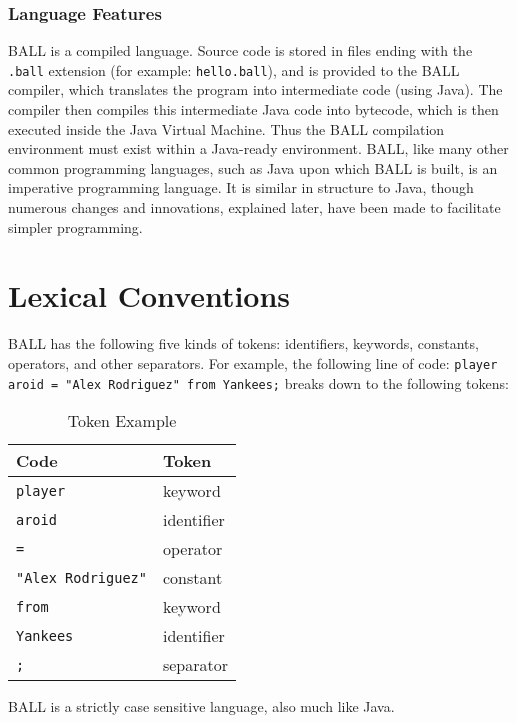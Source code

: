 \subsubsection{Language Features}
BALL is a compiled language. Source code is stored in files ending with the \texttt{.ball} extension (for example: \texttt{hello.ball}), and is provided to the BALL compiler, which translates the program into intermediate code (using Java). The compiler then compiles this intermediate Java code into bytecode, which is then executed inside the Java Virtual Machine. Thus the BALL compilation environment must exist within a Java-ready environment. BALL, like many other common programming languages, such as Java upon which BALL is built, is an imperative programming language. It is similar in structure to Java, though numerous changes and innovations, explained later, have been made to facilitate simpler programming.

\section{Lexical Conventions} \label{lexical convention}
BALL has the following five kinds of tokens: identifiers, keywords, constants, operators, and other separators. For example, the following line of code: \texttt{player aroid = "Alex Rodriguez" from Yankees;} breaks down to the following tokens:


\begin{table}[htdp]
\begin{center}
\begin{tabular}{|l|l|}
\hline
Code & Token\\
\hline
\texttt{player} & keyword \\

\texttt{aroid} & identifier\\

\texttt{=} & operator\\

\texttt{"Alex Rodriguez"} & constant\\

\texttt{from} & keyword\\

\texttt{Yankees} & identifier\\

\texttt{;} & separator\\
\hline
\end{tabular}
\caption{Token Example}
\end{center}
\label{token example}
\end{table}
BALL is a strictly case sensitive language, also much like Java.

